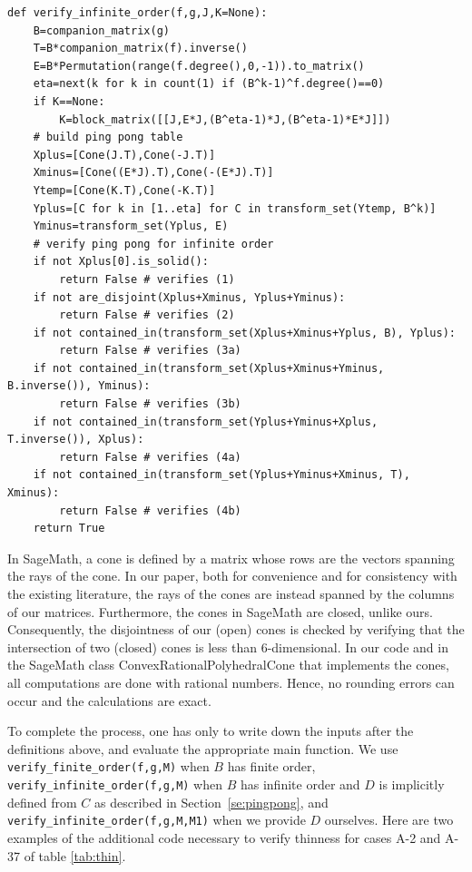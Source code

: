 \documentclass[11pt,a4paper]{amsart}
\theoremstyle{definition}
\theoremstyle{definition}
\numberwithin{equation}{section}
\begin{document}
\begin{verbatim}
def verify_infinite_order(f,g,J,K=None):
    B=companion_matrix(g)
    T=B*companion_matrix(f).inverse()
    E=B*Permutation(range(f.degree(),0,-1)).to_matrix()
    eta=next(k for k in count(1) if (B^k-1)^f.degree()==0)
    if K==None:
        K=block_matrix([[J,E*J,(B^eta-1)*J,(B^eta-1)*E*J]])
    # build ping pong table
    Xplus=[Cone(J.T),Cone(-J.T)]
    Xminus=[Cone((E*J).T),Cone(-(E*J).T)]
    Ytemp=[Cone(K.T),Cone(-K.T)]
    Yplus=[C for k in [1..eta] for C in transform_set(Ytemp, B^k)]
    Yminus=transform_set(Yplus, E)
    # verify ping pong for infinite order
    if not Xplus[0].is_solid():
        return False # verifies (1)
    if not are_disjoint(Xplus+Xminus, Yplus+Yminus):
        return False # verifies (2)
    if not contained_in(transform_set(Xplus+Xminus+Yplus, B), Yplus):
        return False # verifies (3a)
    if not contained_in(transform_set(Xplus+Xminus+Yminus, B.inverse()), Yminus):
        return False # verifies (3b)
    if not contained_in(transform_set(Yplus+Yminus+Xplus, T.inverse()), Xplus):
        return False # verifies (4a)
    if not contained_in(transform_set(Yplus+Yminus+Xminus, T), Xminus):
        return False # verifies (4b)
    return True
\end{verbatim}
\normalsize

\hspace{0.3cm}

In SageMath, a cone is defined by a matrix whose rows are the vectors spanning the rays of the cone. In our paper, both for convenience and for consistency with the existing literature, the rays of the cones are instead spanned by the columns of our matrices. Furthermore, the cones in SageMath are closed, unlike ours. Consequently, the disjointness of our (open) cones is checked by verifying that the intersection of two (closed) cones is less than $6$-dimensional.
In our code and in the SageMath class ConvexRationalPolyhedralCone that implements the cones, all computations are done with rational numbers. Hence, no rounding errors can occur and the calculations are exact.

To complete the process, one has only to write down the inputs after the definitions above, and evaluate the appropriate main function. We use \verb|verify_finite_order(f,g,M)| when $B$ has finite order, \verb|verify_infinite_order(f,g,M)| when $B$ has infinite order and $D$ is implicitly defined from $C$ as described in Section~\ref{se:pingpong}, and \verb|verify_infinite_order(f,g,M,M1)| when we provide $D$ ourselves. Here are two examples of the additional code necessary to verify thinness for cases A-2 and A-37 of table \ref{tab:thin}.
\end{document}
